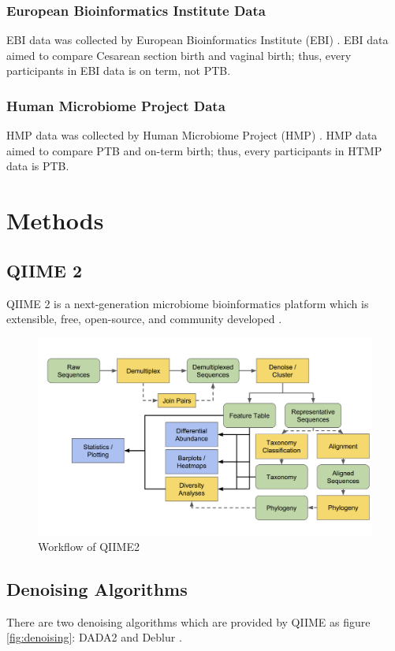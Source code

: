 \documentclass[a4paper]{article}
\begin{document}
            \subsubsection[EBI Data]{European Bioinformatics Institute Data}
                EBI data was collected by European Bioinformatics Institute (EBI) \cite{validate1}. EBI data aimed to compare Cesarean section birth and vaginal birth; thus, every participants in EBI data is on term, not PTB.

            \subsubsection[HMP Data]{Human Microbiome Project Data}
                HMP data was collected by Human Microbiome Project (HMP) \cite{validate2}. HMP data aimed to compare PTB and on-term birth; thus, every participants in HTMP data is PTB.
    \section{Methods}
        \subsection{QIIME 2}
            QIIME 2 is a next-generation microbiome bioinformatics platform which is extensible, free, open-source, and community developed \cite{qiime1, qiime2, qiime3}.

            \begin{figure}[p]
                \centering
                \includegraphics[width=0.6 \linewidth]{figures/qiime.png}
                \caption{Workflow of QIIME2}
                \label{fig:qiime2}
            \end{figure}

        \subsection{Denoising Algorithms}
            There are two denoising algorithms which are provided by QIIME as figure \ref{fig:denoising}: DADA2 \cite{DADA2} and Deblur \cite{Deblur1}.
\end{document}
